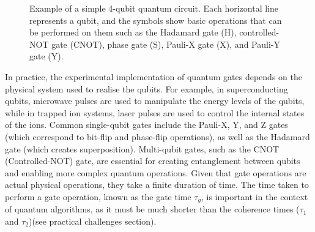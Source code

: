 \documentclass{elbioimp2}
\begin{document}
\begin{figure}[h]
  \centering
  \caption{Example of a simple 4-qubit quantum circuit. Each horizontal line represents a qubit, and the symbols show basic operations that can be performed on them such as the Hadamard gate (H), controlled-NOT gate (CNOT), phase gate (S), Pauli-X gate (X), and Pauli-Y gate (Y).}
\end{figure}

In practice, the experimental implementation of quantum gates depends on the physical system used to realise the qubits. For example, in superconducting qubits, microwave pulses are used to manipulate the energy levels of the qubits, while in trapped ion systems, laser pulses are used to control the internal states of the ions. Common single-qubit gates include the Pauli-X, Y, and Z gates (which correspond to bit-flip and phase-flip operations), as well as the Hadamard gate (which creates superposition). Multi-qubit gates, such as the CNOT (Controlled-NOT) gate, are essential for creating entanglement between qubits and enabling more complex quantum operations. Given that gate operations are actual physical operations, they take a finite duration of time. The time taken to perform a gate operation, known as the gate time $\tau_g$, is important in the context of quantum algorithms, as it must be much shorter than the coherence times ($\tau_1$ and $\tau_2$)(see practical challenges section).
\end{document}
